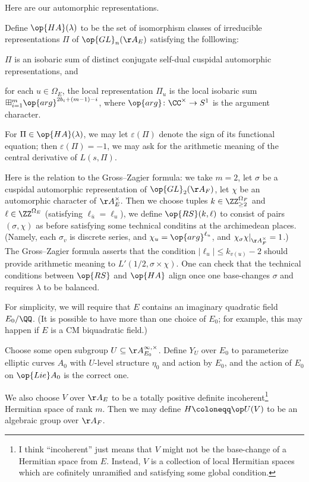 \documentclass{article}
\begin{document}
Here are our automorphic representations.
\begin{definition}
	Define $\op{HA}(\lambda)$ to be the set of isomorphism classes of irreducible representations $\Pi$ of $\op{GL}_n(\AA_E)$ satisfying the folllowing:
	\begin{listalph}
		\item $\Pi$ is an isobaric sum of distinct conjugate self-dual cuspidal automorphic representations, and
		\item for each $u\in\Omega_E$, the local representation $\Pi_u$ is the local isobaric sum $\boxplus_{i=1}^m\op{arg}^{2b_i+(m-1)-i}$, where $\op{arg}\colon\CC^\times\to S^1$ is the argument character.
	\end{listalph}
\end{definition}
For $\Pi\in\op{HA}(\lambda)$, we may let $\varepsilon(\Pi)$ denote the sign of its functional equation; then $\varepsilon(\Pi)=-1$, we may ask for the arithmetic meaning of the central derivative of $L(s,\Pi)$.
\begin{remark}
	Here is the relation to the Gross--Zagier formula: we take $m=2$, let $\sigma$ be a cuspidal automorphic representation of $\op{GL}_2(\AA_F)$, let $\chi$ be an automorphic character of $\AA_E^\times$.
	Then we choose tuples $k\in\ZZ_{\ge2}^{\Omega_F}$ and $\ell\in\ZZ^{\Omega_E}$ (satisfying $\ell_{\overline u}=\ell_u$),
	we define $\op{RS}(k,\ell)$ to consist of pairs $(\sigma,\chi)$ as before satisfying some technical conditins at the archimedean places. (Namely, each $\sigma_v$ is discrete series, and $\chi_u=\op{arg}^{\ell_u}$, and $\chi_\sigma\chi|_{\AA_F^\times}=1$.)
	The Gross--Zagier formula asserts that the condition $\left|\ell_u\right|\le k_{v(u)}-2$ should provide arithmetic meaning to $L'(1/2,\sigma\times\chi)$.
	One can check that the technical conditions between $\op{RS}$ and $\op{HA}$ align once one base-changes $\sigma$ and requires $\lambda$ to be balanced.
\end{remark}
For simplicity, we will require that $E$ contains an imaginary quadratic field $E_0/\QQ$. (It is possible to have more than one choice of $E_0$; for example, this may happen if $E$ is a CM biquadratic field.)
\begin{notation}
	Choose some open subgroup $U\subseteq\AA_{E_0}^{\infty,\times}$. Define $Y_U$ over $E_0$ to parameterize elliptic curves $A_0$ with $U$-level structure $\eta_0$ and action by $E_0$, and the action of $E_0$ on $\op{Lie}A_0$ is the correct one.
\end{notation}
We also choose $V$ over $\AA_E$ to be a totally positive definite incoherent\footnote{I think ``incoherent'' just means that $V$ might not be the base-change of a Hermitian space from $E$. Instead, $V$ is a collection of local Hermitian spaces which are cofinitely unramified and satisfying some global condition.} Hermitian space of rank $m$. Then we may define $H\coloneqq\op U(V)$ to be an algebraic group over $\AA_F$.
\end{document}
